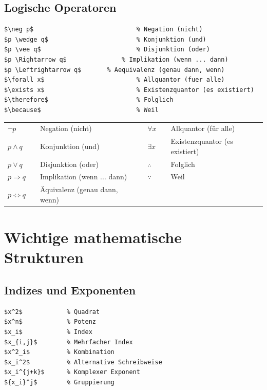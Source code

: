 \documentclass[12pt,a4paper]{article}
\begin{document}
\subsection{Logische Operatoren}

\begin{lstlisting}[style=latex]
$\neg p$         					% Negation (nicht)
$p \wedge q$     					% Konjunktion (und)
$p \vee q$      				 	% Disjunktion (oder)
$p \Rightarrow q$ 				% Implikation (wenn ... dann)
$p \Leftrightarrow q$ 		% Aequivalenz (genau dann, wenn)
$\forall x$      					% Allquantor (fuer alle)
$\exists x$      					% Existenzquantor (es existiert)
$\therefore$     					% Folglich
$\because$       					% Weil
\end{lstlisting}

\begin{ausgabe}
\begin{tabular}{l c l c l c l}
	$\neg p$ & & Negation (nicht) & & $\forall x$ & & Allquantor (für alle)\\
	$p \wedge q$ & & Konjunktion (und) & & $\exists x$ & & Existenzquantor (es existiert)\\
	$p \vee q$ & & Disjunktion (oder) & & $\therefore$ & & Folglich\\
	$p \Rightarrow q$ & & Implikation (wenn ... dann) & & $\because$ & & Weil\\
	$p \Leftrightarrow q$ & & Äquivalenz (genau dann, wenn)
\end{tabular}
\end{ausgabe}



\section{Wichtige mathematische Strukturen}



\subsection{Indizes und Exponenten}

\begin{lstlisting}[style=latex]
$x^2$            % Quadrat
$x^n$            % Potenz
$x_i$            % Index
$x_{i,j}$        % Mehrfacher Index
$x^2_i$          % Kombination
$x_i^2$          % Alternative Schreibweise
$x_i^{j+k}$      % Komplexer Exponent
${x_i}^j$        % Gruppierung
\end{lstlisting}
\end{document}
